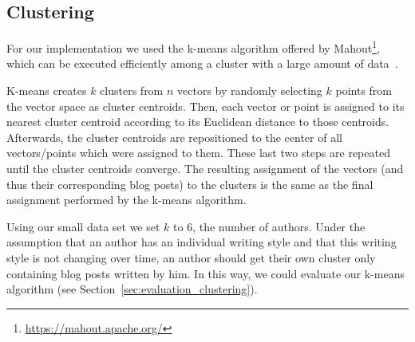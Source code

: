 \subsection{Clustering}
\label{sec:impl_clustering}

For our implementation we used the k-means algorithm offered by Mahout\footnote{\url{https://mahout.apache.org/}}, which can be executed efficiently among a cluster with a large amount of data~\cite{esteves2011k}.


K-means creates $k$ clusters from $n$ vectors by randomly selecting $k$ points from the vector space as cluster centroids.
Then, each vector or point is assigned to its nearest cluster centroid according to its Euclidean distance to those centroids.
Afterwards, the cluster centroids are repositioned to the center of all vectors/points which were assigned to them.
These last two steps are repeated until the cluster centroids converge.
The resulting assignment of the vectors (and thus their corresponding blog posts) to the clusters is the same as the final assignment performed by the k-means algorithm.


Using our small data set we set $k$ to $6$, the number of authors.
Under the assumption that an author has an individual writing style and that this writing style is not changing over time, an author should get their own cluster only containing blog posts written by him.
In this way, we could evaluate our k-means algorithm (see Section~\ref{sec:evaluation_clustering}).


